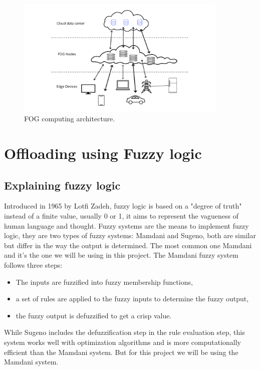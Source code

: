 \begin{figure}[H]
	\centering
	\includegraphics[width=0.90\textwidth]{../images/FOG_network_ink.png}
	\caption{FOG computing architecture.}
	\label{fig:fog-architecture}
\end{figure}

\chapter{Offloading using Fuzzy logic}
\label{chap:fuzzy}

\section{Explaining fuzzy logic}
\label{sec:fuzzy-explanation}

Introduced in 1965 by Lotfi Zadeh,\cite{zadeh-1965} fuzzy logic is based on a "degree of truth" instead of a finite
value, usually 0 or 1, it aims to represent the vagueness of human language and thought. Fuzzy systems are the means
to implement fuzzy logic, they are two types of fuzzy systems: Mamdani and Sugeno, both are similar but differ in the
way the output is determined. The most common one Mamdani and it's the one we will be using in this project. The
Mamdani fuzzy system follows three steps:

\begin{itemize}
	\item The inputs are fuzzified into fuzzy membership functions,
	\item a set of rules are applied to the fuzzy inputs to determine the fuzzy output,
	\item the fuzzy output is defuzzified to get a crisp value.
\end{itemize}

While Sugeno includes the defuzzification step in the rule evaluation step, this system works well with optimization
algorithms and is more computationally efficient than the Mamdani system. But for this project we will be using the
Mamdani system.

